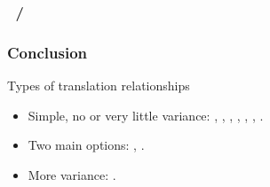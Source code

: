 \subsubsection{~/ }

\tounfold{***}



\subsubsection{}

\tounfold{***}



\subsubsection{}

\tounfold{***}



\subsubsection{}

\tounfold{***}



\subsubsection{Conclusion}

\begin{frame}{Types of translation relationships}
	\begin{itemize}
		\item Simple, no or very little variance:
			, , , , , , .
		\item Two main options:
			, .
		\item More variance:
			.
	\end{itemize}
\end{frame}
